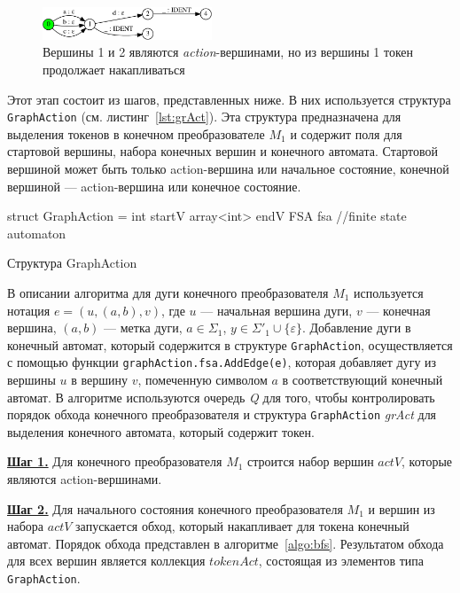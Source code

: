 \documentclass[10pt, conference, compsocconf]{IEEEtran}
\begin{document}
\begin{figure}[!t]
\centering
\includegraphics[width=0.45\textwidth]{pics/ident_ex}
\caption{Вершины 1 и 2 являются \textit{action}-вершинами, но из вершины 1 токен продолжает накапливаться}
\label{fig:ident_ex}
\end{figure}

Этот этап состоит из шагов, представленных ниже. В них используется структура \verb|GraphAction| (см. листинг~\ref{lst:grAct}). Эта структура предназначена для выделения токенов в конечном преобразователе $M_1$ и содержит поля для стартовой вершины, набора конечных вершин и конечного автомата. Стартовой вершиной может быть только action-вершина или начальное состояние, конечной вершиной --- action-вершина или конечное состояние. 

\begin{listing}[h]
\begin{pyglist}[language=csharp,numbers=none,numbersep=5pt]
struct GraphAction =
    int startV  
    array<int> endV
    FSA fsa  //finite state automaton
\end{pyglist}
\caption{Структура GraphAction}
\label{lst:grAct}
\end{listing}

В описании алгоритма для дуги конечного преобразователя $M_1$ используется нотация $e = (u, (a, b), v)$, где $u$ --- начальная вершина дуги, $v$ --- конечная вершина, $(a, b)$ --- метка дуги, $a \in \Sigma_1$, $y \in \Sigma'_1 \cup \{\varepsilon \}$.  Добавление дуги в конечный автомат, который содержится в структуре \verb|GraphAction|, осуществляется с помощью функции \verb|graphAction.fsa.AddEdge(e)|, которая добавляет дугу из вершины $u$ в вершину $v$, помеченную символом $a$ в соответствующий конечный автомат. В алгоритме используются очередь \textit{Q} для того, чтобы контролировать порядок обхода конечного преобразователя и структура \verb|GraphAction| \textit{grAct} для выделения конечного автомата, который содержит токен. 

\textbf{\underline{Шаг 1.}} Для конечного преобразователя $M_1$ строится набор вершин $actV$, которые являются action-вершинами. 

\textbf{\underline{Шаг 2.}} Для начального состояния конечного преобразователя $M_1$ и вершин из набора $actV$ запускается обход, который накапливает для токена конечный автомат. Порядок обхода представлен в алгоритме~\ref{algo:bfs}. Результатом обхода для всех вершин является коллекция $tokenAct$, состоящая из элементов типа \verb|GraphAction|.
\end{document}
